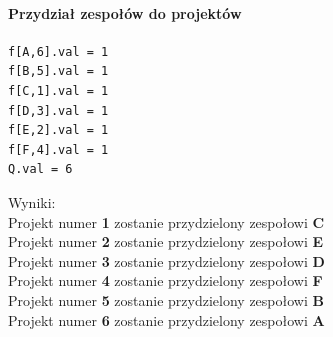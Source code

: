 \paragraph{Przydział zespołów do projektów}
\begin{lstlisting}[caption=wynik z glpk]
f[A,6].val = 1
f[B,5].val = 1
f[C,1].val = 1
f[D,3].val = 1
f[E,2].val = 1
f[F,4].val = 1
Q.val = 6
\end{lstlisting}
Wyniki: \\
Projekt numer \textbf{1} zostanie przydzielony zespołowi \textbf{C} \\
Projekt numer \textbf{2} zostanie przydzielony zespołowi \textbf{E} \\
Projekt numer \textbf{3} zostanie przydzielony zespołowi \textbf{D} \\
Projekt numer \textbf{4} zostanie przydzielony zespołowi \textbf{F} \\
Projekt numer \textbf{5} zostanie przydzielony zespołowi \textbf{B} \\
Projekt numer \textbf{6} zostanie przydzielony zespołowi \textbf{A} \\
